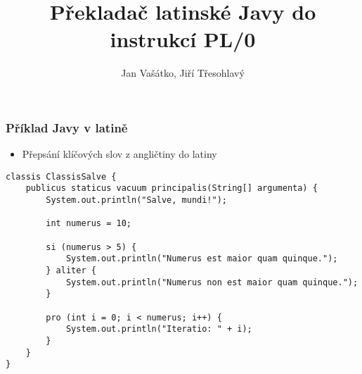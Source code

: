 \documentclass[11pt]{beamer}
\author{Jan Vašátko, Jiří Třesohlavý}
\title{Překladač latinské Javy do instrukcí PL/0}
\institute{Fakulta aplikovaných věd}
\begin{document}
\begin{frame}
\titlepage
\end{frame}


\begin{frame}[fragile]
\frametitle{Příklad Javy v latině}
\begin{itemize}
	\item Přepsání klíčových slov z angličtiny do latiny
\end{itemize}

\begin{lstlisting}
classis ClassisSalve {
    publicus staticus vacuum principalis(String[] argumenta) {
        System.out.println("Salve, mundi!");
        
        int numerus = 10;
        
        si (numerus > 5) {
            System.out.println("Numerus est maior quam quinque.");
        } aliter {
            System.out.println("Numerus non est maior quam quinque.");
        }
        
        pro (int i = 0; i < numerus; i++) {
            System.out.println("Iteratio: " + i);
        }
    }
}
    \end{lstlisting}
\end{frame}
\end{document}
